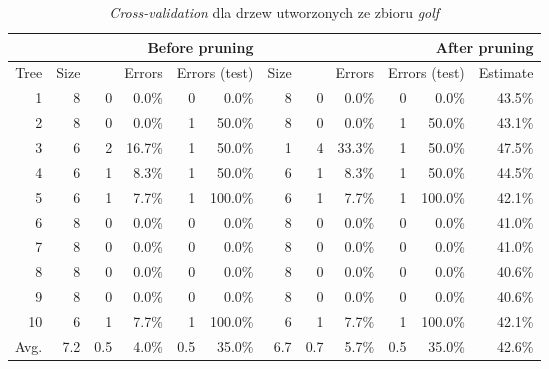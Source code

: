 \begin{table}
\begin{tabular}{|r||r|rr|rr||r|rr|rr|r|}
\hline
&\multicolumn{5}{1||}{Before pruning}&\multicolumn{6}{1|}{After pruning} \\
\hline
Tree & 
Size & 
\multicolumn{2}{1|}{Errors} & 
\multicolumn{2}{1||}{Errors (test)} & 
Size & 
\multicolumn{2}{1|}{Errors} & 
\multicolumn{2}{1|}{Errors (test)} & 
Estimate \\
\hline\hline
    1 &    8 &    0 &  0.0\% &    0 &   0.0\% &    8 &    0 &  0.0\% &    0 &   0.0\% &  43.5\%  \\
    2 &    8 &    0 &  0.0\% &    1 &  50.0\% &    8 &    0 &  0.0\% &    1 &  50.0\% &  43.1\%  \\
    3 &    6 &    2 & 16.7\% &    1 &  50.0\% &    1 &    4 & 33.3\% &    1 &  50.0\% &  47.5\%  \\
    4 &    6 &    1 &  8.3\% &    1 &  50.0\% &    6 &    1 &  8.3\% &    1 &  50.0\% &  44.5\%  \\
    5 &    6 &    1 &  7.7\% &    1 & 100.0\% &    6 &    1 &  7.7\% &    1 & 100.0\% &  42.1\%  \\
    6 &    8 &    0 &  0.0\% &    0 &   0.0\% &    8 &    0 &  0.0\% &    0 &   0.0\% &  41.0\%  \\
    7 &    8 &    0 &  0.0\% &    0 &   0.0\% &    8 &    0 &  0.0\% &    0 &   0.0\% &  41.0\%  \\
    8 &    8 &    0 &  0.0\% &    0 &   0.0\% &    8 &    0 &  0.0\% &    0 &   0.0\% &  40.6\%  \\
    9 &    8 &    0 &  0.0\% &    0 &   0.0\% &    8 &    0 &  0.0\% &    0 &   0.0\% &  40.6\%  \\
   10 &    6 &    1 &  7.7\% &    1 & 100.0\% &    6 &    1 &  7.7\% &    1 & 100.0\% &  42.1\%  \\
\hline\hline
 Avg. &  7.2 &  0.5 &  4.0\% &  0.5 &  35.0\% &  6.7 &  0.7 &  5.7\% &  0.5 &  35.0\% &  42.6\%  \\
\hline
\end{tabular}
\caption{\emph{Cross-validation} dla drzew utworzonych ze zbioru \emph{golf}}
\label{p2t2-golf-trees-cv}
\end{table}
